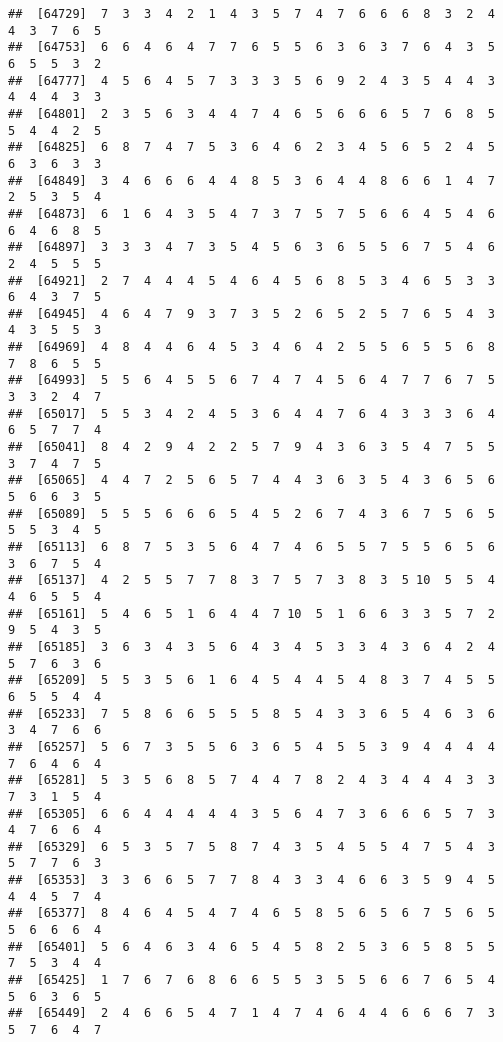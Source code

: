 \documentclass[
]{book}
\begin{document}
\begin{verbatim}
##  [64729]  7  3  3  4  2  1  4  3  5  7  4  7  6  6  6  8  3  2  4  4  3  7  6  5
##  [64753]  6  6  4  6  4  7  7  6  5  5  6  3  6  3  7  6  4  3  5  6  5  5  3  2
##  [64777]  4  5  6  4  5  7  3  3  3  5  6  9  2  4  3  5  4  4  3  4  4  4  3  3
##  [64801]  2  3  5  6  3  4  4  7  4  6  5  6  6  6  5  7  6  8  5  5  4  4  2  5
##  [64825]  6  8  7  4  7  5  3  6  4  6  2  3  4  5  6  5  2  4  5  6  3  6  3  3
##  [64849]  3  4  6  6  6  4  4  8  5  3  6  4  4  8  6  6  1  4  7  2  5  3  5  4
##  [64873]  6  1  6  4  3  5  4  7  3  7  5  7  5  6  6  4  5  4  6  6  4  6  8  5
##  [64897]  3  3  3  4  7  3  5  4  5  6  3  6  5  5  6  7  5  4  6  2  4  5  5  5
##  [64921]  2  7  4  4  4  5  4  6  4  5  6  8  5  3  4  6  5  3  3  6  4  3  7  5
##  [64945]  4  6  4  7  9  3  7  3  5  2  6  5  2  5  7  6  5  4  3  4  3  5  5  3
##  [64969]  4  8  4  4  6  4  5  3  4  6  4  2  5  5  6  5  5  6  8  7  8  6  5  5
##  [64993]  5  5  6  4  5  5  6  7  4  7  4  5  6  4  7  7  6  7  5  3  3  2  4  7
##  [65017]  5  5  3  4  2  4  5  3  6  4  4  7  6  4  3  3  3  6  4  6  5  7  7  4
##  [65041]  8  4  2  9  4  2  2  5  7  9  4  3  6  3  5  4  7  5  5  3  7  4  7  5
##  [65065]  4  4  7  2  5  6  5  7  4  4  3  6  3  5  4  3  6  5  6  5  6  6  3  5
##  [65089]  5  5  5  6  6  6  5  4  5  2  6  7  4  3  6  7  5  6  5  5  5  3  4  5
##  [65113]  6  8  7  5  3  5  6  4  7  4  6  5  5  7  5  5  6  5  6  3  6  7  5  4
##  [65137]  4  2  5  5  7  7  8  3  7  5  7  3  8  3  5 10  5  5  4  4  6  5  5  4
##  [65161]  5  4  6  5  1  6  4  4  7 10  5  1  6  6  3  3  5  7  2  9  5  4  3  5
##  [65185]  3  6  3  4  3  5  6  4  3  4  5  3  3  4  3  6  4  2  4  5  7  6  3  6
##  [65209]  5  5  3  5  6  1  6  4  5  4  4  5  4  8  3  7  4  5  5  6  5  5  4  4
##  [65233]  7  5  8  6  6  5  5  5  8  5  4  3  3  6  5  4  6  3  6  3  4  7  6  6
##  [65257]  5  6  7  3  5  5  6  3  6  5  4  5  5  3  9  4  4  4  4  7  6  4  6  4
##  [65281]  5  3  5  6  8  5  7  4  4  7  8  2  4  3  4  4  4  3  3  7  3  1  5  4
##  [65305]  6  6  4  4  4  4  4  3  5  6  4  7  3  6  6  6  5  7  3  4  7  6  6  4
##  [65329]  6  5  3  5  7  5  8  7  4  3  5  4  5  5  4  7  5  4  3  5  7  7  6  3
##  [65353]  3  3  6  6  5  7  7  8  4  3  3  4  6  6  3  5  9  4  5  4  4  5  7  4
##  [65377]  8  4  6  4  5  4  7  4  6  5  8  5  6  5  6  7  5  6  5  5  6  6  6  4
##  [65401]  5  6  4  6  3  4  6  5  4  5  8  2  5  3  6  5  8  5  5  7  5  3  4  4
##  [65425]  1  7  6  7  6  8  6  6  5  5  3  5  5  6  6  7  6  5  4  5  6  3  6  5
##  [65449]  2  4  6  6  5  4  7  1  4  7  4  6  4  4  6  6  6  7  3  5  7  6  4  7

\end{verbatim}
\end{document}

